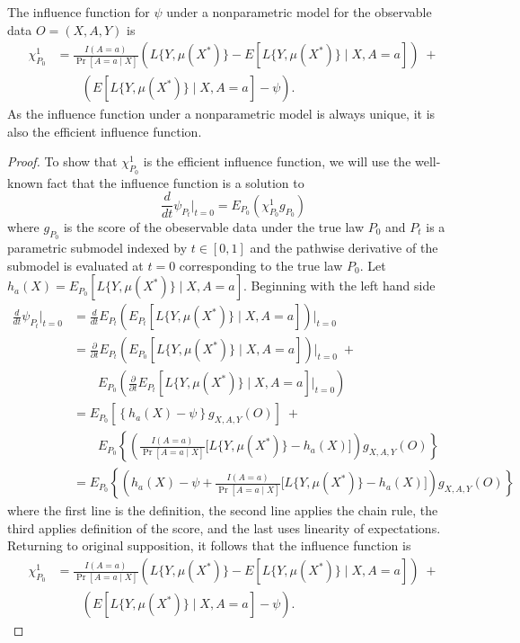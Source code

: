 \begin{theorem}
    The influence function for $\psi$ under a nonparametric model for the observable data $O = (X, A, Y)$ is 
\begin{align*}
    \chi_{P_0}^1 &= \frac{I(A = a)}{\Pr[A = a \mid X]}(L\{Y, \mu(X^*)\} - E[L\{Y, \mu(X^*)\} \mid X, A=a])  \; + \\
    & \qquad (E[L\{Y, \mu(X^*)\} \mid X, A=a] - \psi).
\end{align*}
As the influence function under a nonparametric model is always unique, it is also the efficient influence function. 
\end{theorem}


\begin{proof}
To show that $\chi_{P_0}^1$ is the efficient influence function, we will use the well-known fact that the influence function is a solution to 
\begin{equation*}
    \frac{d}{dt} \psi_{P_t}\bigg\vert_{t=0} = E_{P_0}(\chi_{P_0}^1g_{P_0})
\end{equation*}
where $g_{P_0}$ is the score of the obeservable data under the true law $P_0$ and $P_t$ is a parametric submodel indexed by $t \in [0,1]$ and the pathwise derivative of the submodel is evaluated at $t = 0$ corresponding to the true law $P_0$. Let $h_a(X) = E_{P_0}[L\{Y, \mu(X^*)\} \mid X, A=a]$. Beginning with the left hand side
\begin{align*}
    \frac{d}{dt} \psi_{P_t}\bigg\vert_{t=0} &=\frac{d}{dt} E_{P_t}\left(E_{P_t}[L\{Y, \mu(X^*)\} \mid X, A=a] \right)\bigg\vert_{t=0} \\
    &=\frac{\partial}{\partial t} E_{P_t}\left(E_{P_0}[L\{Y, \mu(X^*)\} \mid X, A=a] \right)\bigg\vert_{t=0} \;+ \\
    &\qquad  E_{P_0}\left(\frac{\partial}{\partial t} E_{P_t}[L\{Y, \mu(X^*)\} \mid X, A=a] \bigg\vert_{t=0} \right) \\
    &=E_{P_0}\left[\left\{h_a(X) - \psi \right\}g_{X, A, Y}(O)\right] \;+ \\
    &\qquad  E_{P_0}\left\{\left( \frac{I(A = a)}{\Pr[A = a \mid X]} \bigg[L\{Y, \mu(X^*)\} - h_a(X) \bigg]\right)g_{X, A, Y}(O)\right\} \\
    &= E_{P_0}\left\{\left(h_a(X) - \psi + \frac{I(A = a)}{\Pr[A = a \mid X]} \bigg[L\{Y, \mu(X^*)\} - h_a(X) \bigg]\right)g_{X, A, Y}(O)\right\} 
\end{align*}
where the first line is the definition, the second line applies the chain rule, the third applies definition of the score, and the last uses linearity of expectations. Returning to original supposition, it follows that the influence function is 
\begin{align*}
    \chi_{P_0}^1 &= \frac{I(A = a)}{\Pr[A = a \mid X]}(L\{Y, \mu(X^*)\} - E[L\{Y, \mu(X^*)\} \mid X, A=a])  \; + \\
    & \qquad (E[L\{Y, \mu(X^*)\} \mid X, A=a] - \psi).
\end{align*}
\end{proof}

